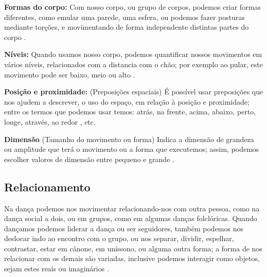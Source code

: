 \textbf{Formas do corpo:} Com nosso corpo, ou grupo de corpos, podemos criar formas diferentes,
como emular uma parede, uma esfera, 
ou podemos fazer posturas mediante torções, 
e movimentando de forma independente distintas partes do corpo 
\cite[pp. 8]{carline2011lesson}
\cite[pp. 32]{paine2014complete}
\cite[pp. 97]{schrader2005sense}.

\textbf{Níveis:} Quando usamos nosso corpo, 
podemos quantificar nossos movimentos em vários níveis,
relacionados com a distancia com o chão;
por exemplo ao pular, este movimento pode ser baixo, meio ou alto 
\cite[pp. 8]{carline2011lesson}
\cite[pp. 32]{paine2014complete}
\cite[pp. 96]{schrader2005sense}.

\textbf{Posição e proximidade:}  (Preposições espaciais)
É possível usar preposições que nos ajudem a descrever, o uso do espaço,
em relação à posição e proximidade; entre os termos que podemos usar temos:
atrás, na frente, 
acima, abaixo, 
perto, longe, 
através, ao redor
\cite[pp. 32]{paine2014complete} 
\cite[pp. 9]{carline2011lesson}, etc.

\textbf{Dimensão} (Tamanho do movimento ou forma) 
Indica a dimensão de grandeza ou amplitude que terá o movimento ou a forma que executemos;
assim, podemos escolher valores de dimensão entre pequeno e grande 
\cite[pp. 32]{paine2014complete} 
\cite[pp. 99]{schrader2005sense}.



\subsection{Relacionamento} 
Na dança podemos nos movimentar relacionando-nos com outra pessoa, como na dança social a  dois,
ou em grupos, como em algumas danças folclóricas.
Quando dançamos podemos liderar a dança ou ser seguidores, 
também podemos nos deslocar indo ao encontro com o grupo, 
ou nos separar, dividir, espelhar, contrastar, 
estar em cânone, em uníssono, ou alguma outra forma;
a forma de nos relacionar com os demais são variadas,
inclusive podemos interagir como objetos, sejam estes reais ou imaginários
 \cite[pp. 9]{carline2011lesson}
 \cite[pp. 27, 32-33]{paine2014complete}
\cite[pp. 131, 132, 134]{mccutchen2006teaching}.



